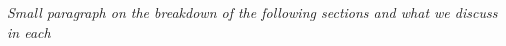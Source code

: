 \documentclass[draft]{agujournal2019}
\begin{document}
\emph{Small paragraph on the breakdown of the following sections and what we discuss in each}





%
%
%
%
%
%
%
%
%
%

%
%
\end{document}
